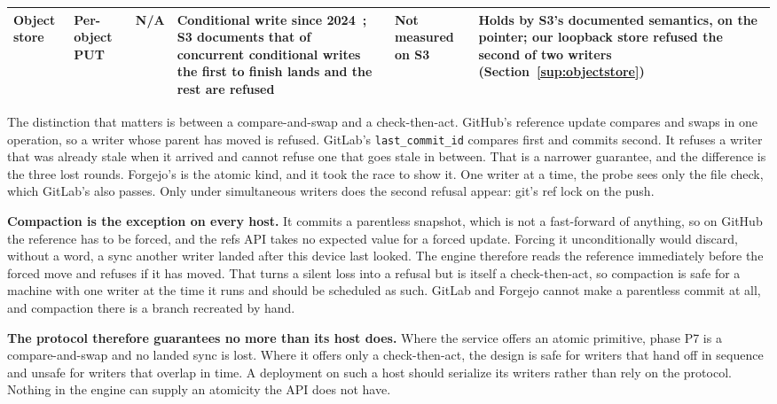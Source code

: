 \documentclass[journal,10pt]{IEEEtran}
\begin{document}
\begin{table}[t]
\begin{tabular}{@{}P{0.11\textwidth}
                P{0.14\textwidth}
                P{0.18\textwidth}
                P{0.14\textwidth}
                P{0.09\textwidth}
                P{0.22\textwidth}@{}}
\addlinespace

Object store &
Per-object PUT &
N/A &
Conditional write since 2024~\cite{s3conditional,s3cas2024}; S3 documents that of concurrent conditional writes the first to finish lands and the rest are refused &
Not measured on S3 &
Holds by S3's documented semantics, on the pointer; our loopback store refused the second of two writers (Section~\ref{sup:objectstore}) \\

\bottomrule
\end{tabular}
\end{table}

The distinction that matters is between a compare-and-swap and a check-then-act.
GitHub's reference update compares and swaps in one operation, so a writer whose
parent has moved is refused. GitLab's \texttt{last\_commit\_id} compares first
and commits second. It refuses a writer that was already stale when it arrived
and cannot refuse one that goes stale in between. That is a narrower guarantee,
and the difference is the three lost rounds. Forgejo's is the atomic kind, and
it took the race to show it. One writer at a time, the probe sees only the file
check, which GitLab's also passes. Only under simultaneous writers does the
second refusal appear: git's ref lock on the push.

\textbf{Compaction is the exception on every host.} It commits a parentless
snapshot, which is not a fast-forward of anything, so on GitHub the reference
has to be forced, and the refs API takes no expected value for a forced update.
Forcing it unconditionally would discard, without a word, a sync another writer
landed after this device last looked. The engine therefore reads the reference
immediately before the forced move and refuses if it has moved. That turns a
silent loss into a refusal but is itself a check-then-act, so compaction is
safe for a machine with one writer at the time it runs and should be scheduled
as such. GitLab and Forgejo cannot make a parentless commit at all, and
compaction there is a branch recreated by hand.

\textbf{The protocol therefore guarantees no more than its host does.} Where the
service offers an atomic primitive, phase P7 is a compare-and-swap and no landed
sync is lost. Where it offers only a check-then-act, the design is safe for
writers that hand off in sequence and unsafe for writers that overlap in time.
A deployment on such a host should serialize its writers rather than rely on
the protocol. Nothing in the engine can supply an atomicity the API does not
have.
\end{document}
